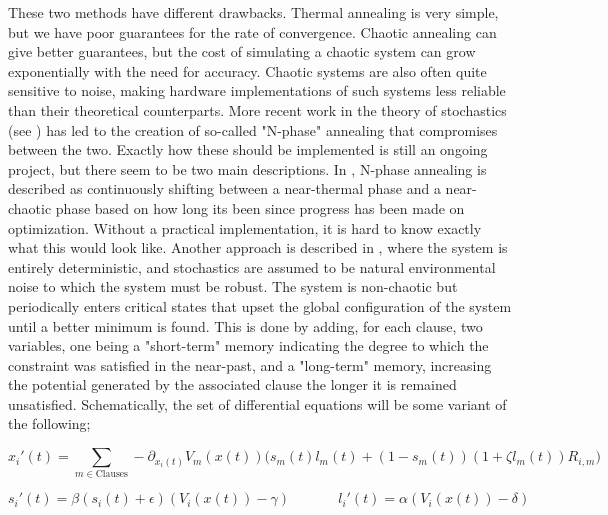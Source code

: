 These two methods have different drawbacks. Thermal annealing is very simple, but we have poor guarantees for the rate of convergence. Chaotic annealing can give better guarantees, but the cost of simulating a chaotic system can grow exponentially with the need for accuracy. Chaotic systems are also often quite sensitive to noise, making hardware implementations of such systems less reliable than their theoretical counterparts. More recent work in the theory of stochastics (see \citep{ovchinnikov2016introduction}) has led to the creation of so-called "N-phase" annealing that compromises between the two. Exactly how these should be implemented is still an ongoing project, but there seem to be two main descriptions. In \citep{ovchinnikov2017stochastic}, N-phase annealing is described as continuously shifting between a near-thermal phase and a near-chaotic phase based on how long its been since progress has been made on optimization. Without a practical implementation, it is hard to know exactly what this would look like. Another approach is described in \citep{di2022memcomputing}, where the system is entirely deterministic, and stochastics are assumed to be natural environmental noise to which the system must be robust. The system is non-chaotic but periodically enters critical states that upset the global configuration of the system until a better minimum is found. This is done by adding, for each clause, two variables, one being a "short-term" memory indicating the degree to which the constraint was satisfied in the near-past, and a "long-term" memory, increasing the potential generated by the associated clause the longer it is remained unsatisfied. Schematically, the set of differential equations will be some variant of the following;

\begin{equation}
    x_i'(t) = \sum_{m \in \text{Clauses}} -\partial_{x_i(t)} V_m(x(t)) \big(s_m(t) l_m(t) + (1 - s_m(t)) (1 + \zeta l_m(t)) R_{i, m}\big)
\end{equation}

\begin{equation}
    s_i'(t) = \beta (s_i(t) + \epsilon) (V_i(x(t)) - \gamma)\ \quad \quad \quad\ l_i'(t) = \alpha (V_i(x(t)) - \delta)
\end{equation}

